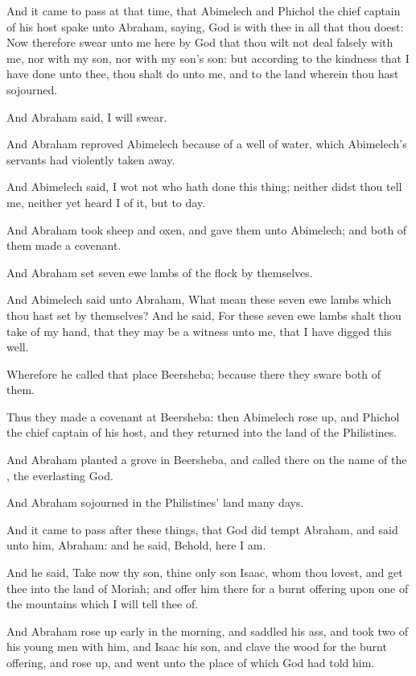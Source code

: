 \Verse And it came to pass at that time, that Abimelech and Phichol the chief captain of his host spake unto Abraham, saying, God is with thee in all that thou doest: \Verse Now therefore swear unto me here by God that thou wilt not deal falsely with me, nor with my son, nor with my son's son: but according to the kindness that I have done unto thee, thou shalt do unto me, and to the land wherein thou hast sojourned.

\Verse And Abraham said, I will swear.

\Verse And Abraham reproved Abimelech because of a well of water, which Abimelech's servants had violently taken away.

\Verse And Abimelech said, I wot not who hath done this thing; neither didst thou tell me, neither yet heard I of it, but to day.

\Verse And Abraham took sheep and oxen, and gave them unto Abimelech; and both of them made a covenant.

\Verse And Abraham set seven ewe lambs of the flock by themselves.

\Verse And Abimelech said unto Abraham, What mean these seven ewe lambs which thou hast set by themselves?  \Verse And he said, For these seven ewe lambs shalt thou take of my hand, that they may be a witness unto me, that I have digged this well.

\Verse Wherefore he called that place Beersheba; because there they sware both of them.

\Verse Thus they made a covenant at Beersheba: then Abimelech rose up, and Phichol the chief captain of his host, and they returned into the land of the Philistines.

\Verse And Abraham planted a grove in Beersheba, and called there on the name of the \LORD, the everlasting God.

\Verse And Abraham sojourned in the Philistines' land many days.

\Chapter
\Verse And it came to pass after these things, that God did tempt Abraham, and said unto him, Abraham: and he said, Behold, here I am.

\Verse And he said, Take now thy son, thine only son Isaac, whom thou lovest, and get thee into the land of Moriah; and offer him there for a burnt offering upon one of the mountains which I will tell thee of.

\Verse And Abraham rose up early in the morning, and saddled his ass, and took two of his young men with him, and Isaac his son, and clave the wood for the burnt offering, and rose up, and went unto the place of which God had told him.

